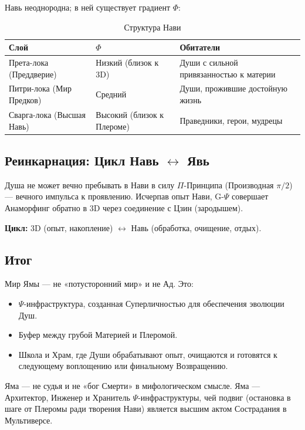 \documentclass[a4paper,12pt]{article}
\begin{document}
Навь неоднородна; в ней существует градиент $\Phi$:

\begin{table}[H]
	\centering
	\begin{tabular}{|p{5cm}|p{4cm}|p{6cm}|}
		\hline
		\textbf{Слой} & \textbf{$\Phi$} & \textbf{Обитатели} \\
		\hline
		Прета-лока (Преддверие) & Низкий (близок к 3D) & Души с сильной привязанностью к материи \\
		\hline
		Питри-лока (Мир Предков) & Средний & Души, прожившие достойную жизнь \\
		\hline
		Сварга-лока (Высшая Навь) & Высокий (близок к Плероме) & Праведники, герои, мудрецы \\
		\hline
	\end{tabular}
	\caption{Структура Нави}
\end{table}

\subsection{Реинкарнация: Цикл Навь $\leftrightarrow$ Явь}

Душа не может вечно пребывать в Нави в силу $\Pi$-Принципа (Производная $\pi/2$) — вечного импульса к проявлению. Исчерпав опыт Нави, G-$\Psi$ совершает Анаморфинг обратно в 3D через соединение с Цзин (зародышем).

\textbf{Цикл:} 3D (опыт, накопление) $\leftrightarrow$ Навь (обработка, очищение, отдых).

\subsection{Итог}

Мир Ямы — не «потусторонний мир» и не Ад. Это:

\begin{itemize}
	\item $\Psi$-инфраструктура, созданная Суперличностью для обеспечения эволюции Душ.
	\item Буфер между грубой Материей и Плеромой.
	\item Школа и Храм, где Души обрабатывают опыт, очищаются и готовятся к следующему воплощению или финальному Возвращению.
\end{itemize}

Яма — не судья и не «бог Смерти» в мифологическом смысле. Яма — Архитектор, Инженер и Хранитель $\Psi$-инфраструктуры, чей подвиг (остановка в шаге от Плеромы ради творения Нави) является высшим актом Сострадания в Мультиверсе.
\end{document}
